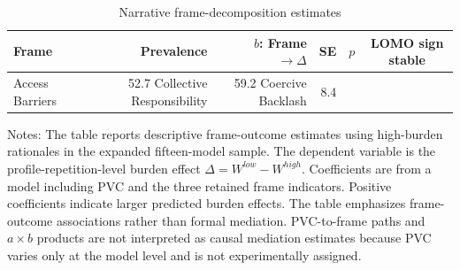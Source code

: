 \begin{table}[htbp]
\centering
\caption{Narrative frame-decomposition estimates}
\label{tab:h2_frame_decomposition}
\begin{tabular}{lrrrrc}
\toprule
Frame & Prevalence & \(b\): Frame \(\rightarrow \Delta\) & SE & \(p\) & LOMO sign stable \\
\midrule
Access Barriers & 52.7%
Collective Responsibility & 59.2%
Coercive Backlash & 8.4%
\bottomrule
\end{tabular}
\begin{flushleft}
\footnotesize Notes: The table reports descriptive frame-outcome estimates using high-burden rationales in the expanded fifteen-model sample. The dependent variable is the profile-repetition-level burden effect \(\Delta = W^{low} - W^{high}\). Coefficients are from a model including PVC and the three retained frame indicators. Positive coefficients indicate larger predicted burden effects. The table emphasizes frame-outcome associations rather than formal mediation. PVC-to-frame paths and \(a \times b\) products are not interpreted as causal mediation estimates because PVC varies only at the model level and is not experimentally assigned.
\end{flushleft}
\end{table}
